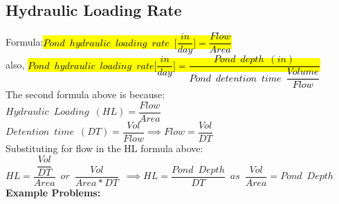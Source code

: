 \subsection{Hydraulic Loading Rate}
Formula:\hl{$Pond \enspace hydraulic \enspace loading \enspace rate \enspace \Bigg[\dfrac{in}{day}\Bigg]=\dfrac{Flow}{Area}$}\\
also, \hl{$Pond \enspace hydraulic \enspace loading \enspace rate \Bigg[\dfrac{in}{day}\Bigg]=\dfrac{Pond \enspace depth \enspace (in)}{Pond \enspace detention  \enspace time \enspace \dfrac{Volume}{Flow}}$ }\\
The second formula above is because:\\
\vspace{0.3cm}
$Hydraulic \enspace Loading \enspace (HL)=\dfrac{Flow}{Area}$\\
\vspace{0.3cm}
$Detention \enspace time \enspace (DT)=\dfrac{Vol}{Flow} \implies Flow=\dfrac{Vol}{DT} $\\
\vspace{0.3cm}
Substituting for flow in  the HL formula above:\\
\vspace{0.3cm}
$HL=\dfrac{\dfrac{Vol}{DT}}{Area}\enspace or \enspace \dfrac{Vol}{Area*DT} \enspace \implies \boxed{HL=\dfrac{Pond \enspace Depth}{DT}} \enspace as \enspace \dfrac{Vol}{Area}=Pond \enspace Depth$\\
\vspace{0.3cm}
\textbf{Example Problems:}\\

